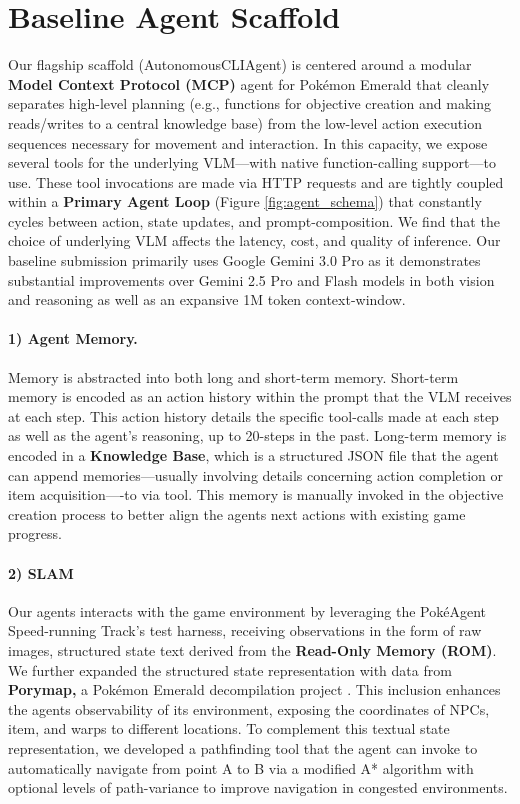 \documentclass[11pt]{article}
\begin{document}
\section{Baseline Agent Scaffold}
Our flagship scaffold (AutonomousCLIAgent) is centered around a modular \textbf{Model Context Protocol (MCP)} agent for Pokémon Emerald that cleanly separates high-level planning (e.g., functions for objective creation and making reads/writes to a central knowledge base) from the low-level action execution sequences necessary for movement and interaction. In this capacity, we expose several tools \cite{systemprompt2025code} for the underlying VLM---with native function-calling support---to use.  These tool invocations are made via HTTP requests and are tightly coupled within a \textbf{Primary Agent Loop} (Figure \ref{fig:agent_schema}) that constantly cycles between action, state updates, and prompt-composition. We find that the choice of underlying VLM  affects the latency, cost, and quality of inference. Our baseline submission primarily uses Google Gemini 3.0 Pro as it demonstrates substantial improvements over Gemini 2.5 Pro and Flash models in both vision and reasoning as well as an expansive 1M token context-window.

\paragraph{1) Agent Memory.}
Memory is abstracted into both long and short-term memory. Short-term memory is encoded as an action history within the prompt that the VLM receives at each step. This action history details the specific tool-calls made at each step as well as the agent's reasoning, up to 20-steps in the past. Long-term memory is encoded in a \textbf{Knowledge Base}, which is a structured JSON file that the agent can append memories---usually involving details concerning action completion or item acquisition----to via tool. This memory is manually invoked in the objective creation process to better align the agents next actions with existing game progress.

\paragraph{2) SLAM}
Our agents interacts with the game environment by leveraging the PokéAgent Speed-running Track's test harness, receiving observations in the form of raw images, structured state text derived from  the \textbf{Read-Only Memory (ROM)}. We further expanded the structured state representation with data from \textbf{Porymap,} a Pokémon Emerald decompilation project \citep{huderlem2025porymap}. This inclusion enhances the agents observability of its environment, exposing the coordinates of  NPCs, item, and warps to different locations.  To complement this textual state representation, we developed a pathfinding tool that the agent can invoke to automatically navigate from point A to B via a modified A* algorithm with optional levels of path-variance to improve navigation in congested environments. 
\end{document}
